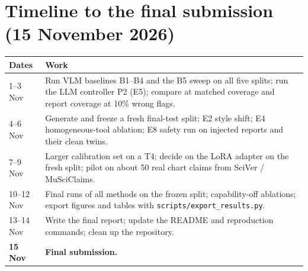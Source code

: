 \documentclass[11pt,a4paper]{article}
\newcommand{\code}[1]{\texttt{\small #1}}
\begin{document}
\section{Timeline to the final submission (15 November 2026)}

\begin{center}\small
\begin{tabularx}{\linewidth}{lX}
\toprule
Dates & Work \\
\midrule
1--3 Nov & Run VLM baselines B1--B4 and the B5 sweep on all five splits; run the LLM controller P2 (E5); compare at matched coverage and report coverage at 10\% wrong flags. \\
4--6 Nov & Generate and freeze a fresh final-test split; E2 style shift; E4 homogeneous-tool ablation; E8 safety run on injected reports and their clean twins. \\
7--9 Nov & Larger calibration set on a T4; decide on the LoRA adapter on the fresh split; pilot on about 50 real chart claims from SciVer / MuSciClaims. \\
10--12 Nov & Final runs of all methods on the frozen split; capability-off ablations; export figures and tables with \code{scripts/export\_results.py}. \\
13--14 Nov & Write the final report; update the README and reproduction commands; clean up the repository. \\
\textbf{15 Nov} & \textbf{Final submission.} \\
\bottomrule
\end{tabularx}
\end{center}
\end{document}
